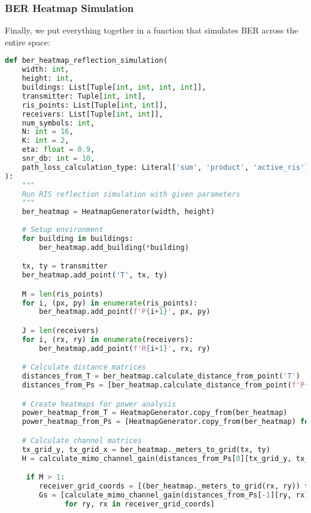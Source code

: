 \newpage
\subsubsection{BER Heatmap Simulation}

Finally, we put everything together in a function that simulates BER across the entire space:

\begin{lstlisting}[language=python, caption={BER Heatmap Simulation}]
def ber_heatmap_reflection_simulation(
    width: int,
    height: int,
    buildings: List[Tuple[int, int, int, int]],
    transmitter: Tuple[int, int],
    ris_points: List[Tuple[int, int]],
    receivers: List[Tuple[int, int]],
    num_symbols: int,
    N: int = 16,
    K: int = 2,
    eta: float = 0.9,
    snr_db: int = 10,
    path_loss_calculation_type: Literal['sum', 'product', 'active_ris'] = 'sum'
):
    """
    Run RIS reflection simulation with given parameters
    """
    ber_heatmap = HeatmapGenerator(width, height)
    
    # Setup environment
    for building in buildings:
        ber_heatmap.add_building(*building)

    tx, ty = transmitter
    ber_heatmap.add_point('T', tx, ty)

    M = len(ris_points)
    for i, (px, py) in enumerate(ris_points):
        ber_heatmap.add_point(f'P{i+1}', px, py)

    J = len(receivers)
    for i, (rx, ry) in enumerate(receivers):
        ber_heatmap.add_point(f'R{i+1}', rx, ry)

    # Calculate distance matrices
    distances_from_T = ber_heatmap.calculate_distance_from_point('T')
    distances_from_Ps = [ber_heatmap.calculate_distance_from_point(f'P{i+1}') for i in range(M)]

    # Create heatmaps for power analysis
    power_heatmap_from_T = HeatmapGenerator.copy_from(ber_heatmap)
    power_heatmap_from_Ps = [HeatmapGenerator.copy_from(ber_heatmap) for _ in range(M)]

    # Calculate channel matrices
    tx_grid_y, tx_grid_x = ber_heatmap._meters_to_grid(tx, ty)
    H = calculate_mimo_channel_gain(distances_from_Ps[0][tx_grid_y, tx_grid_x], K, N)

     if M > 1:
        receiver_grid_coords = [(ber_heatmap._meters_to_grid(rx, ry)) for rx, ry in receivers]
        Gs = [calculate_mimo_channel_gain(distances_from_Ps[-1][ry, rx], N, K) 
              for ry, rx in receiver_grid_coords]


\end{lstlisting}
